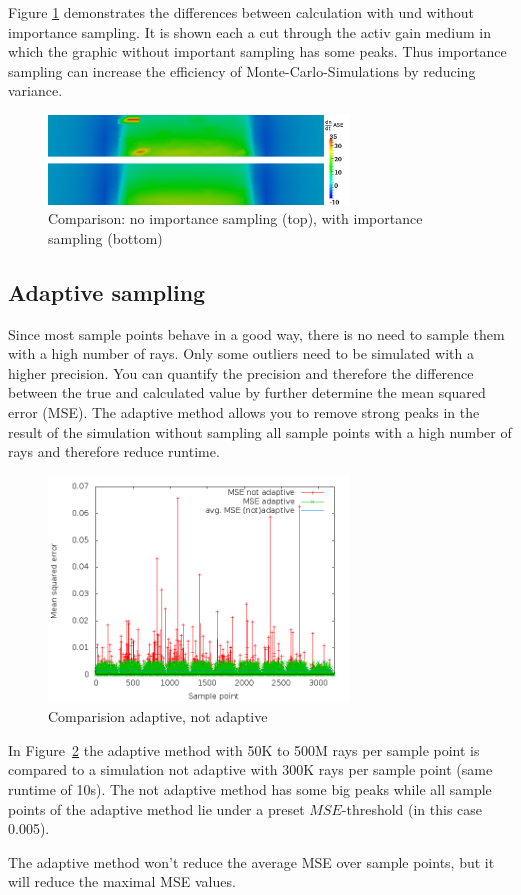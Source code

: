 Figure \ref{graphic:importance} demonstrates
the differences between calculation with und without
importance sampling. It is shown each a cut through the activ 
gain medium in which the graphic without important
sampling has some peaks. Thus importance 
sampling can increase the efficiency of Monte-Carlo-Simulations 
by reducing variance.
\begin{figure}[H]
  \centering
  \includegraphics[width=8cm]{graphics/importance.png}
  \caption{Comparison: no importance sampling (top), with importance sampling (bottom)}
  \label{graphic:importance}
\end{figure}

\subsection{Adaptive sampling}
Since most sample points behave in a good way, there is no need
to sample them with a high number of rays. Only some outliers need to
be simulated with a higher precision. You can quantify the precision
and therefore the difference between the true and calculated value by
further determine the mean squared error (MSE).
The adaptive method allows you to remove strong peaks in the result
of the simulation without sampling all sample points with
a high number of rays and therefore reduce runtime.
\begin{figure}[H]
  \centering
  \includegraphics[width=8cm]{plot/mse.png}
  \caption{Comparision adaptive, not adaptive}
  \label{plot:adaptive}
\end{figure}
In Figure~\ref{plot:adaptive} the adaptive method with 
50K to 500M rays per sample point is compared to a simulation 
not adaptive with 300K rays per sample point (same runtime of 10s).
The not adaptive method has some big peaks while all sample points of 
the adaptive method lie under a preset $MSE$-threshold (in this case 0.005). 

The adaptive method won't reduce the average MSE over sample points,
but it will reduce the maximal
MSE values. 


